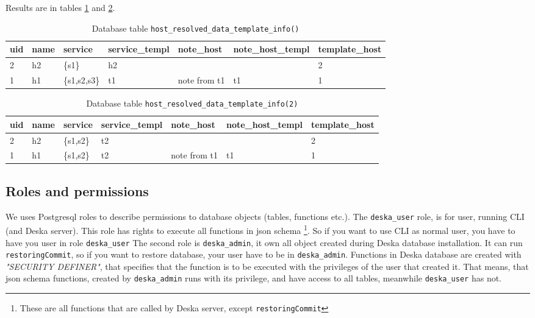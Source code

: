 \documentclass[deska]{subfiles}
\begin{document}
Results are in tables \ref{tab:multi-reshost} and \ref{tab:multi-reshostv2}.

\begin{longtable}{ l | l | l | l | l | l | l }
    \caption{Database table {\tt host\_resolved\_data\_template\_info()}}\\
    uid &  name &  service &  service\_templ &  note\_host &  note\_host\_templ &  template\_host\\
    \hline
    \endhead
\label{tab:multi-reshost}
    2 & h2 & \{s1\} & h2 &  &  & 2\\
    1 & h1 & \{s1,s2,s3\} & t1 & note from t1 & t1 & 1\\
    \hline
\end{longtable}

\begin{longtable}{ l | l | l | l | l | l | l }
    \caption{Database table {\tt host\_resolved\_data\_template\_info(2)}}\\
    uid &  name &  service &  service\_templ &  note\_host &  note\_host\_templ &  template\_host\\
    \hline
    \endhead
\label{tab:multi-reshostv2}
    2 & h2 & \{s1,s2\} & t2 &  &  & 2\\
    1 & h1 & \{s1,s2\} & t2 & note from t1 & t1 & 1\\
    \hline
\end{longtable}

\subsection{Roles and permissions}
We uses Postgresql roles to describe permissions to database objects (tables, functions etc.).
The {\tt deska\_user} role, is for user, running CLI (and Deska server). This role
has rights to execute all functions in json schema \footnote{These are all functions
that are called by Deska server, except {\tt restoringCommit}}.
So if you want to use CLI as normal user, you have to have you user in role {\tt deska\_user}
The second role is {\tt deska\_admin}, it own all object created during Deska database installation.
It can run {\tt restoringCommit}, so if you want to restore database, your user have to be in {\tt deska\_admin}.
Functions in Deska database are created with {\em "SECURITY DEFINER"}, that
specifies that the function is to be executed with the privileges of the user that created it.
That means, that json schema functions, created by {\tt deska\_admin} runs with its privilege,
and have access to all tables, meanwhile {\tt deska\_user} has not.
\end{document}
